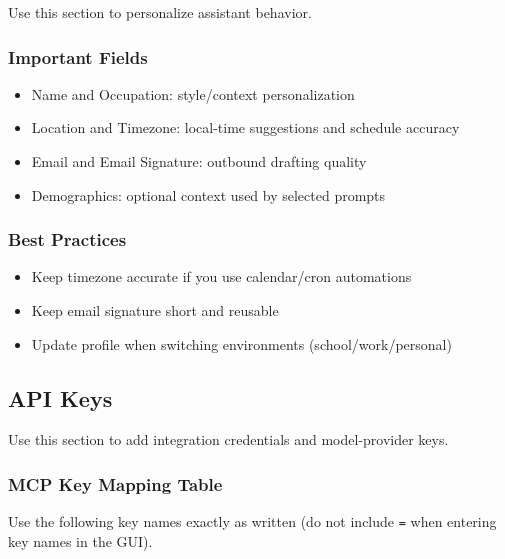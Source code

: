 \documentclass{article}
\begin{document}
Use this section to personalize assistant behavior.

\subsubsection{Important Fields}
\begin{itemize}
	\item Name and Occupation: style/context personalization
	\item Location and Timezone: local-time suggestions and schedule accuracy
	\item Email and Email Signature: outbound drafting quality
	\item Demographics: optional context used by selected prompts
\end{itemize}

\subsubsection{Best Practices}
\begin{itemize}
	\item Keep timezone accurate if you use calendar/cron automations
	\item Keep email signature short and reusable
	\item Update profile when switching environments (school/work/personal)
\end{itemize}

\subsection{API Keys}

Use this section to add integration credentials and model-provider keys.

\subsubsection{MCP Key Mapping Table}
Use the following key names exactly as written (do not include \texttt{=} when entering key names in the GUI).
\end{document}

